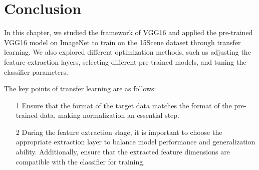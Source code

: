 \documentclass{rapportECL}
\begin{document}
\section{Conclusion}
In this chapter, we studied the framework of VGG16 and applied the pre-trained VGG16 model on ImageNet to train on the 15Scene dataset through transfer learning. We also explored different optimization methods, such as adjusting the feature extraction layers, selecting different pre-trained models, and tuning the classifier parameters.

The key points of transfer learning are as follows:
\vspace{-0.8em}
\begin{enumerate}
    \item[1] Ensure that the format of the target data matches the format of the pre-trained data, making normalization an essential step.
    \item[2] During the feature extraction stage, it is important to choose the appropriate extraction layer to balance model performance and generalization ability. Additionally, ensure that the extracted feature dimensions are compatible with the classifier for training.
\end{enumerate}
\end{document}
